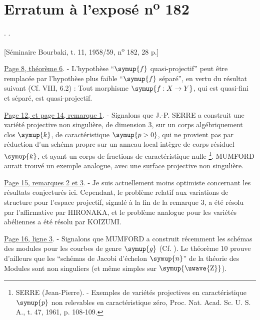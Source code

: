 \clearpage
\chapter*{Erratum à l'exposé n\textsuperscript{o} 182}
\setcounter{footnote}{1}

. .

\begin{center}
[Séminaire Bourbaki, t. 11, 1958/59, n\textsuperscript{o} 182, 28 p.]
\end{center}

\noindent\uline{Page 8, théorème 6}. - L'hypothèse ``$\symup{f}$
quasi-projectif'' peut être remplacée par l'hypothèse plus faible ``$\symup{f}$
séparé'', en vertu du résultat suivant (Cf.  VIII, 6.2) : Tout morphisme
$\symup{f:X\to Y}$, qui est quasi-fini et séparé, est quasi-projectif.

\begingroup
\makeatletter
\renewcommand\@makefnmark{\hbox{\normalfont(\textsuperscript{\@thefnmark})}}
\makeatother
\noindent\uline{Page 12, et page 14, remarque 1}. - Signalons que J.-P.
SERRE a construit une variété projective non singulière, de dimension 3, sur
un corps algébriquement clos $\symup{k}$, de caractéristique $\symup{p>0}$, qui ne provient pas
par réduction d'un schéma propre sur un anneau local intègre de corps résiduel
$\symup{k}$, et ayant un corps de fractions de caractéristique
nulle \footnote[2]{SERRE (Jean-Pierre). - Exemples de variétés projectives en
caractéristique $\symup{p}$ non relevables en caractéristique zéro, Proc. Nat.
Acad. Sc. U. S. A., t. 47, 1961, p. 108-109.}. MUMFORD aurait trouvé un exemple
analogue, avec une \uline{surface} projective non singulière.

\noindent\uline{Page 15, remarques 2 et 3}. - Je suis actuellement moins
optimiste concernant les résultats conjecturés ici. Cependant, le problème
relatif aux variations de structure pour l'espace projectif, signalé à la fin
de la remarque 3, a été résolu par l'affirmative par HIRONAKA, et le problème
analogue pour les variétés abéliennes a été résolu par KOIZUMI.

\noindent\uline{Page 16, ligne 3}. - Signalons que MUMFORD a construit
récemment les schémas des modules pour les courbes de genre $\symup{g}$ (Cf. ). Le
théorème 10 prouve d'ailleurs que les ``schémas de Jacobi d'échelon $\symup{n}$'' de la
théorie des Modules sont non singuliers (et même simples sur $\symup{\text{\uwave{Z}}}$).

